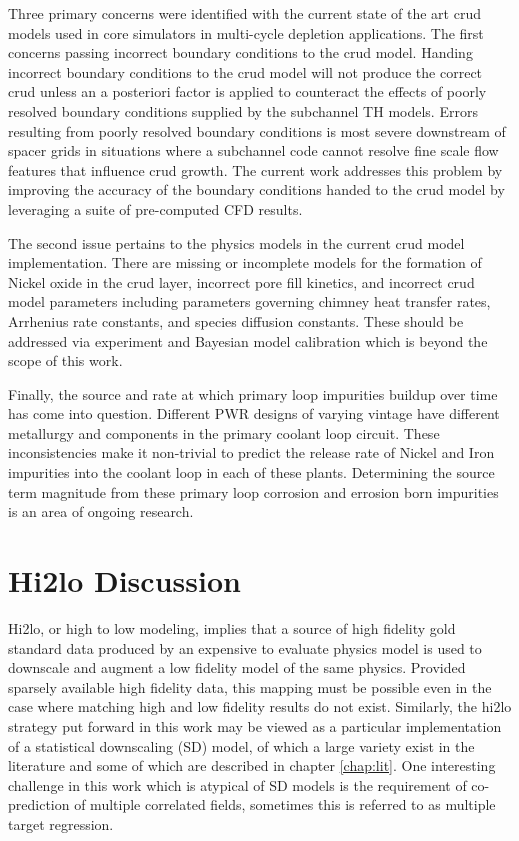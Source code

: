 Three primary concerns were identified with the current state of the art crud models used in core simulators in multi-cycle depletion applications.
The first concerns passing incorrect boundary conditions to the crud model.  Handing incorrect boundary conditions to the crud model will not produce the correct crud unless an a posteriori factor is applied to counteract the effects of poorly resolved boundary conditions supplied by the subchannel TH models.  Errors resulting from poorly resolved boundary conditions is most severe downstream of spacer grids in situations where a subchannel code cannot resolve fine scale flow features that influence crud growth.  The current work addresses this problem by improving the accuracy of the boundary conditions handed to the crud model by leveraging a suite of pre-computed CFD results.

The second issue pertains to the physics models in the current crud model implementation.  There are missing or incomplete models for the formation of Nickel oxide in the crud layer, incorrect pore fill kinetics, and incorrect crud model parameters including parameters governing chimney heat transfer rates, Arrhenius rate constants, and species diffusion constants. These should be addressed via experiment and Bayesian model calibration which is beyond the scope of this work.

Finally, the source and rate at which primary loop impurities buildup over time has come into question.  Different PWR designs of varying vintage have different metallurgy and components in the primary coolant loop circuit.  These inconsistencies make it non-trivial to predict the release rate of Nickel and Iron impurities into the coolant loop in each of these plants.  Determining the source term magnitude from these primary loop corrosion and errosion born impurities is an area of ongoing research.



\section{Hi2lo Discussion}

Hi2lo, or high to low modeling, implies that a source of high fidelity gold standard data produced by an expensive to evaluate physics model is used to downscale and augment a low fidelity model of the same physics.
Provided sparsely available high fidelity data, this mapping must be possible even in the case where matching high and low fidelity results do not exist.  Similarly, the hi2lo strategy put forward in this work may be viewed as a particular implementation of a statistical downscaling (SD) model, of which a large variety exist in the literature and some of which are described in chapter \ref{chap:lit}.  One interesting challenge in this work which is atypical of SD models is the requirement of co-prediction of multiple correlated fields, sometimes this is referred to as multiple target regression.

